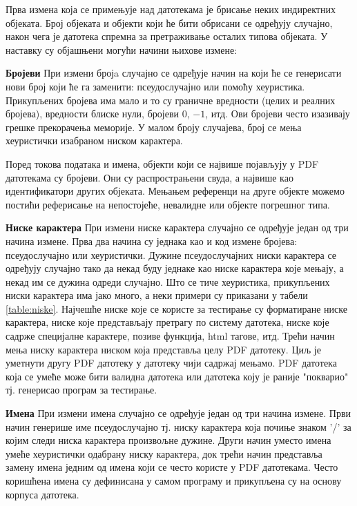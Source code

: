 \documentclass[12pt,oneside]{memoir}
\begin{document}
Прва измена која се примењује над датотекама је брисање неких индиректних објеката. Број објеката и објекти који ће бити обрисани се одређују случајно, након чега је датотека спремна за претраживање осталих типова објеката.
У наставку су објашњени могући начини њихове измене:
\begin{description}
\item{\textbf{Бројеви}} При измени бројa случајно се одређује начин на који ће се генерисати нови број који ће га заменити: псеудослучајно или помоћу хеуристика. Прикупљених бројева има мало и то су граничне вредности (целих и реалних бројева), вредности блиске нули, бројеви $0$, $-1$, итд. Ови бројеви често изазивају грешке прекорачења меморије. У малом броју случајева, број се мења хеуристички изабраном ниском карактера. 

Поред токова података и имена, објекти који се највише појављују у PDF датотекама су бројеви. Они су распрострањени свуда, а највише као идентификатори других објеката. Мењањем референци на друге објекте можемо постићи реферисање на непостојеће, невалидне или објекте погрешног типа.  
\item{\textbf{Ниске карактера}} При измени ниске карактера случајно се одређује један од три начина измене. Прва два начина су једнака као и код измене бројева: псеудослучајно или хеуристички. Дужине псеудослучајних ниски карактера се одређују случајно тако да некад буду једнаке као ниске карактера које мењају, а некад им се дужина одреди случајно. Што се тиче хеуристика, прикупљених ниски карактера има јако много, а неки примери су приказани у табели \ref{table:niske}. Најчешће ниске које се користе за тестирање су форматиране ниске карактера, ниске које представљају претрагу по систему датотека, ниске које садрже специјалне карактере, позиве функција, html тагове, итд. Трећи начин мења ниску карактера ниском која представља целу PDF датотеку. Циљ је уметнути другу PDF датотеку у датотеку чији садржај мењамо. PDF датотека која се умеће може бити валидна датотека или датотека коју је раније "покварио" тј. генерисао програм за тестирање.
\item{\textbf{Имена}} При измени имена случајно се одређује један од три начина измене. Први начин генерише име псеудослучајно тј. ниску карактера која почиње знаком '/' за којим следи ниска карактера произвољне дужине. Други начин уместо имена умеће хеуристички одабрану ниску карактера, док трећи начин представља замену имена једним од имена који се често користе у PDF датотекама. Често коришћена имена су дефинисана у самом програму и прикупљена су на основу корпуса датотека.

\end{description}
\end{document}
